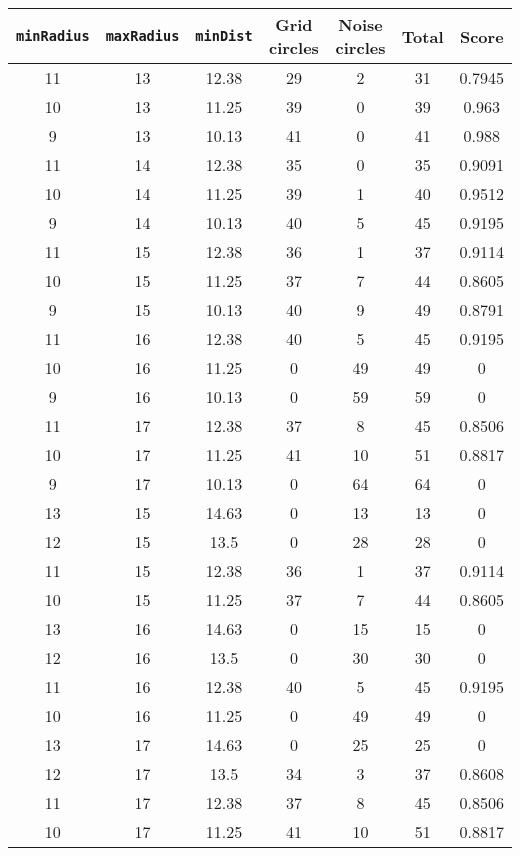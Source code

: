 \documentclass[letterpaper, 12pt]{article}
\begin{document}
\begin{longtable}{|c|c|c|c|c|c|c|}
\hline
\textbf{\texttt{minRadius}} & \textbf{\texttt{maxRadius}} & \textbf{\texttt{minDist}} & \textbf{Grid circles} & \textbf{Noise circles} & \textbf{Total} & \textbf{Score} \\
\hline
11 & 13 & 12.38 & 29 & 2 & 31 & 0.7945 \\
\hline
10 & 13 & 11.25 & 39 & 0 & 39 & 0.963 \\
\hline
9 & 13 & 10.13 & 41 & 0 & 41 & 0.988 \\
\hline
11 & 14 & 12.38 & 35 & 0 & 35 & 0.9091 \\
\hline
10 & 14 & 11.25 & 39 & 1 & 40 & 0.9512 \\
\hline
9 & 14 & 10.13 & 40 & 5 & 45 & 0.9195 \\
\hline
11 & 15 & 12.38 & 36 & 1 & 37 & 0.9114 \\
\hline
10 & 15 & 11.25 & 37 & 7 & 44 & 0.8605 \\
\hline
9 & 15 & 10.13 & 40 & 9 & 49 & 0.8791 \\
\hline
11 & 16 & 12.38 & 40 & 5 & 45 & 0.9195 \\
\hline
10 & 16 & 11.25 & 0 & 49 & 49 & 0 \\
\hline
9 & 16 & 10.13 & 0 & 59 & 59 & 0 \\
\hline
11 & 17 & 12.38 & 37 & 8 & 45 & 0.8506 \\
\hline
10 & 17 & 11.25 & 41 & 10 & 51 & 0.8817 \\
\hline
9 & 17 & 10.13 & 0 & 64 & 64 & 0 \\
\hline
13 & 15 & 14.63 & 0 & 13 & 13 & 0 \\
\hline
12 & 15 & 13.5 & 0 & 28 & 28 & 0 \\
\hline
11 & 15 & 12.38 & 36 & 1 & 37 & 0.9114 \\
\hline
10 & 15 & 11.25 & 37 & 7 & 44 & 0.8605 \\
\hline
13 & 16 & 14.63 & 0 & 15 & 15 & 0 \\
\hline
12 & 16 & 13.5 & 0 & 30 & 30 & 0 \\
\hline
11 & 16 & 12.38 & 40 & 5 & 45 & 0.9195 \\
\hline
10 & 16 & 11.25 & 0 & 49 & 49 & 0 \\
\hline
13 & 17 & 14.63 & 0 & 25 & 25 & 0 \\
\hline
12 & 17 & 13.5 & 34 & 3 & 37 & 0.8608 \\
\hline
11 & 17 & 12.38 & 37 & 8 & 45 & 0.8506 \\
\hline
10 & 17 & 11.25 & 41 & 10 & 51 & 0.8817 \\

\end{longtable}
\end{document}
